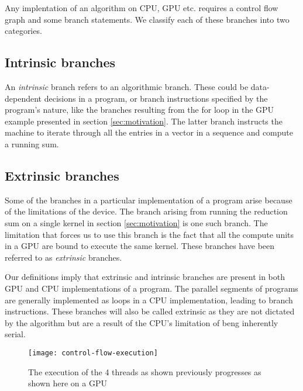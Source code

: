 
Any implentation of an algorithm on CPU, GPU etc. requires a control flow graph and some branch statements. We classify each of these branches into two categories.
\subsection{Intrinsic branches}
	An \textit{intrinsic} branch refers to an algorithmic branch. These could be data-dependent decisions in a program, or branch instructions specified by the program's nature, like the branches resulting from the for loop in the GPU example presented in section \ref{sec:motivation}. The latter branch instructs the machine to iterate through all the entries in a vector in a sequence and compute a running sum.

\subsection{Extrinsic branches}
	Some of the branches in a particular implementation of a program arise because of the limitations of the device. The branch arising from running the reduction sum on a single kernel in section \ref{sec:motivation} is one such branch. The limitation that forces us to use this branch is the fact that all the compute units in a GPU are bound to execute the same kernel. These branches have been referred to as \textit{extrinsic} branches.

\par{
	Our definitions imply that extrinsic and intrinsic branches are present in both GPU and CPU implementations of a program. The parallel segments of programs are generally implemented as loops in a CPU implementation, leading to branch instructions. These branches will also be called extrinsic as they are not dictated by the algorithm but are a result of the CPU's limitation of beng inherently serial.
}

\begin{figure}
	\centering
	\texttt{[image: control-flow-execution]}
	\caption{The execution of the 4 threads as shown previously progresses as shown here on a GPU
		\label{fig:control-flow-execution}}
\end{figure}

